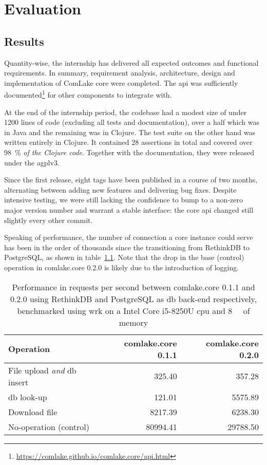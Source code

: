\chapter{Evaluation}

\section{Results}
Quantity-wise, the internship has delivered
all expected outcomes and functional requirements.  In summary,
requirement analysis, architecture, design and implementation
of ComLake core were completed.  The \gls{api} was sufficiently
documented\footnote{\url{https://comlake.github.io/comlake.core/api.html}}
for other components to integrate with.

At the end of the internship period, the codebase had a modest size of under
1200 lines of code (excluding all tests and documentation), over a half which
was in Java and the remaining was in Clojure.  The test suite on the other hand
was written entirely in Clojure.  It contained 28 assertions in total
and covered over \SI{98}{\percent} \emph{of the Clojure code}.  Together with
the documentation, they were released under the \gls{agplv3}.

Since the first release, eight tags have been published in a course
of two months, alternating between adding new features and delivering
bug fixes.  Despite intensive testing, we were still lacking the confidence
to bump to a non-zero major version number and warrant a stable interface:
the core \gls{api} changed still slightly every other commit.

Speaking of performance, the number of connection a core instance could serve
has been in the order of thousands since the transitioning from RethinkDB
to PostgreSQL, as shown in table~\ref{rdbpsql}.  Note that the drop in
the base (control) operation in comlake.core 0.2.0 is likely due to
the introduction of logging.
\begin{table}\centering
  \caption{Performance in requests per second between comlake.core 0.1.1
  and 0.2.0 using RethinkDB and PostgreSQL as \gls{db} back-end respectively,
  benchmarked using wrk on a Intel\textsuperscript{\tiny\textregistered}
  Core\textsuperscript{\tiny\texttrademark} i5-8250U \acrshort{cpu} and
  \SI{8}{\giga\byte} of memory}
  \begin{tabular}{l r r}
    \toprule
    Operation & comlake.core 0.1.1 & comlake.core 0.2.0\\
    \midrule
    File upload \emph{and} \gls{db} insert & 325.40 & 357.28\\
    \gls{db} look-up & 121.01 & 5575.89\\
    Download file & 8217.39 & 6238.30\\
    No-operation (control) & 80994.41 & 29788.50\\
    \bottomrule
  \end{tabular}
  \label{rdbpsql}
\end{table}

